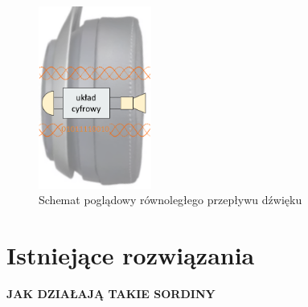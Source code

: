 \begin{figure}[H]
	\centering
	\includegraphics[height=6cm]{zdjecia/conv_time.png}
	\caption{\label{pic:conv_time} Schemat poglądowy równoległego przepływu dźwięku}
\end{figure}



\chapter{Istniejące rozwiązania}
\label{cha:ist_rozw}

\textbf{JAK DZIAŁAJĄ TAKIE SORDINY}